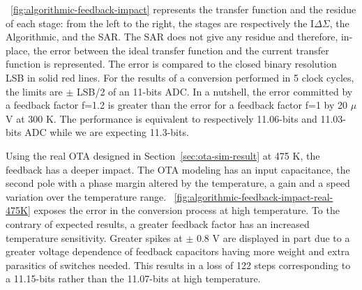 \figurename~\ref{fig:algorithmic-feedback-impact} represents the transfer function and the residue of each stage: from the left to the right, the stages are respectively the I\(\Delta\Sigma\), the Algorithmic, and the SAR\@. The SAR does not give any residue and therefore, in-place, the error between the ideal transfer function and the current transfer function is represented. The error is compared to the closed binary resolution LSB in solid red lines. For the results of a conversion performed in 5 clock cycles, the limits are $\pm$ LSB/2 of an 11-bits ADC\@. In a nutshell, the error committed by a feedback factor f=1.2 is greater than the error for a feedback factor f=1 by 20 $\mu$V at 300 K. The performance is equivalent to respectively 11.06-bits and 11.03-bits ADC while we are expecting 11.3-bits.

Using the real OTA designed in Section~\ref{sec:ota-sim-result} at 475 K, the feedback has a deeper impact. The OTA modeling has an input capacitance, the second pole with a phase margin altered by the temperature, a gain and a speed variation over the temperature range. \figurename~\ref{fig:algorithmic-feedback-impact-real-475K} exposes the error in the conversion process at high temperature. To the contrary of expected results, a greater feedback factor has an increased temperature sensitivity. Greater spikes at $\pm$ 0.8 V are displayed in part due to a greater voltage dependence of feedback capacitors having more weight and extra parasitics of switches needed. This results in a loss of 122 steps corresponding to a 11.15-bits rather than the 11.07-bits at high temperature.

